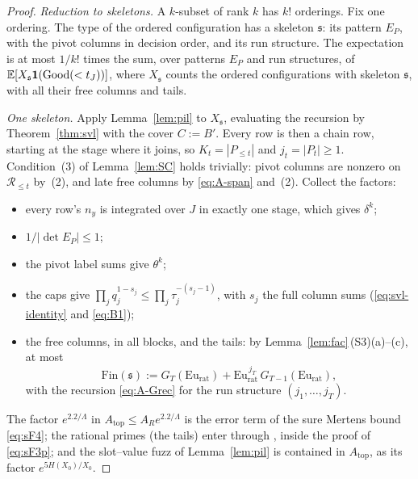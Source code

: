 \begin{proof}
\emph{Reduction to skeletons.} A $k$-subset of rank $k$ has $k!$ orderings. Fix one ordering. The type of the ordered
configuration has a skeleton $\mathfrak s$: its pattern $E_P$, with the pivot columns in decision order, and its run
structure. The expectation is at most $1/k!$ times the sum, over patterns $E_P$ and run structures, of
$\mathbb{E}[X_{\mathfrak s}\mathbf 1(\mathrm{Good}(<t_J))]$, where $X_{\mathfrak s}$ counts the ordered configurations with skeleton
$\mathfrak s$, with all their free columns and tails.

\emph{One skeleton.} Apply Lemma~\ref{lem:pil} to $X_{\mathfrak s}$, evaluating the recursion by Theorem~\ref{thm:svl}
with the cover $C:=B'$. Every row is then a chain row, starting at the stage where it joins, so $K_t=|P_{\le t}|$ and
$j_t=|P_t|\ge1$. Condition~(3) of Lemma~\ref{lem:SC} holds trivially: pivot columns are nonzero on $\mathcal R_{\le t}$
by~(2), and late free columns by \eqref{eq:A-span} and~(2). Collect the factors:
\begin{itemize}
\item every row's $n_y$ is integrated over $J$ in exactly one stage, which gives $\delta^k$;
\item $1/|\det E_P|\le1$;
\item the pivot label sums give $\theta^k$;
\item the caps give $\prod_jq_j^{1-s_j}\le\prod_j\tau_j^{-(s_j-1)}$, with $s_j$ the full column sums
  (\eqref{eq:svl-identity} and \eqref{eq:B1});
\item the free columns, in all blocks, and the tails: by Lemma~\ref{lem:fac}\,(S3)(a)--(c), at most
  \[
    \mathrm{Fin}(\mathfrak s):=G_T(\mathrm{Eu}_{\mathrm{rat}})+\mathrm{Eu}_{\mathrm{rat}}^{\,j_T}\,G_{T-1}(\mathrm{Eu}_{\mathrm{rat}}),
  \]
  with the recursion \eqref{eq:A-Grec} for the run structure $(j_1,\dots,j_T)$.
\end{itemize}
The factor $e^{2.2/\Lambda}$ in $A_{\mathrm{top}}\le A_Re^{2.2/\Lambda}$ is the error term of the sure Mertens bound
\ref{eq:sF4}; the rational primes (the tails) enter through \cite[Thm.~8, (3.29)]{RosserSchoenfeld1962}, inside the
proof of \ref{eq:sF3p}; and the slot--value fuzz of Lemma~\ref{lem:pil} is contained in $A_{\mathrm{top}}$, as its
factor $e^{5H(X_0)/X_0}$.


\end{proof}
